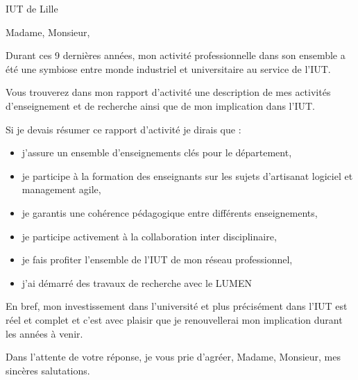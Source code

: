 \documentclass{lettre}
\begin{document}
\begin{letter}{ IUT de Lille }

\address{\textsc{Thomas Clavier}\\45 rue d'Inkermann\\59100 Roubaix}
\nofax
{}

\makeatletter
\def\rule@length{0}
\makeatother


\signature{Thomas Clavier}

\opening{Madame, Monsieur,}

Durant ces 9 dernières années, mon activité professionnelle dans son ensemble a été une symbiose entre monde industriel et universitaire au service de l'IUT.

Vous trouverez dans mon rapport d'activité une description de mes activités d'enseignement et de recherche ainsi que de mon implication dans l'IUT.

Si je devais résumer ce rapport d'activité je dirais que :
\begin{itemize}
  \item j'assure un ensemble d'enseignements clés pour le département,
  \item je participe à la formation des enseignants sur les sujets d'artisanat logiciel et management agile,
  \item je garantis une cohérence pédagogique entre différents enseignements,
  \item je participe activement à la collaboration inter disciplinaire,
  \item je fais profiter l'ensemble de l'IUT de mon réseau professionnel,
  \item j'ai démarré des travaux de recherche avec le LUMEN
\end{itemize}

  En bref, mon investissement dans l'université et plus précisément dans l'IUT est réel et complet et c'est avec plaisir que je renouvellerai mon implication durant les années à venir.

\closing{ Dans l'attente de votre réponse, je vous prie d’agréer, Madame, Monsieur, mes sincères salutations.}

\end{letter}
\end{document}

